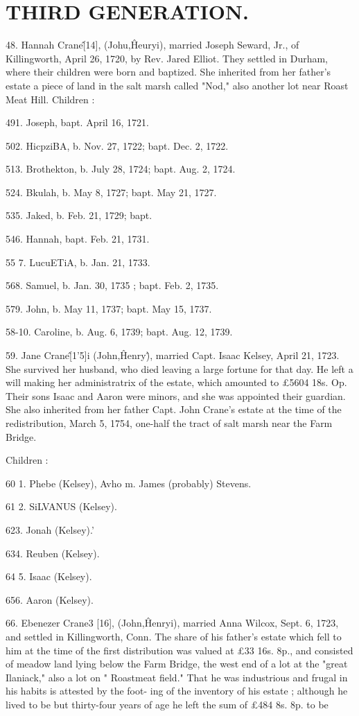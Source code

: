 \section{THIRD GENERATION.}


48. Hannah Crane\^ [14], (Johu,\^ Heuryi), married Joseph 
Seward, Jr., of Killingworth, April 26, 1720, by Rev. Jared 
Elliot. They settled in Durham, where their children were born 
and baptized. She inherited from her father's estate a piece of 
land in the salt marsh called "Nod," also another lot near Roast 
Meat Hill. Children : 

491. Joseph, bapt. April 16, 1721. 

502. HicpziBA, b. Nov. 27, 1722; bapt. Dec. 2, 1722. 

 513. Brothekton, b. July 28, 1724; bapt. Aug. 2, 1724. 

524. Bkulah, b. May 8, 1727; bapt. May 21, 1727. 

535. Jaked, b. Feb. 21, 1729; bapt. 

546. Hannah, bapt. Feb. 21, 1731. 

55  7. LucuETiA, b. Jan. 21, 1733. 

568. Samuel, b. Jan. 30, 1735 ; bapt. Feb. 2, 1735. 

579. John, b. May 11, 1737; bapt. May 15, 1737. 

58-10. Caroline, b. Aug. 6, 1739; bapt. Aug. 12, 1739. 

59. Jane Crane\^ [1'5]i (John,\^ Henry\^), married Capt. Isaac 
Kelsey, April 21, 1723. She survived her husband, who died 
leaving a large fortune for that day. He left a will making her 
administratrix of the estate, which amounted to £5604  18s.  Op. 
Their sons Isaac and Aaron were minors, and she was appointed 
their guardian. She also inherited from her father Capt. John 
Crane's estate at the time of the redistribution, March 5, 1754, 
one-half the tract of salt marsh near the Farm Bridge. 

Children : 

60  1. Phebe (Kelsey), Avho m. James (probably) Stevens. 

61  2. SiLVANUS (Kelsey). 

623. Jonah (Kelsey).' 

634. Reuben (Kelsey). 

64  5. Isaac (Kelsey). 

656. Aaron (Kelsey). 

66. Ebenezer Crane3 [16], (John,\^ Henryi), married Anna 
Wilcox, Sept. 6, 1723, and settled in Killingworth, Conn. The 
share of his father's estate which fell to him at the time of the 
first distribution was valued at £33  16s.  8p., and consisted of 
meadow land lying below the Farm Bridge, the west end of a lot 
at the "great Ilaniack," also a lot on " Roastmeat field." That 
he was industrious and frugal in his habits is attested by the foot- 
ing of the inventory of his estate ; although he lived to be but 
thirty-four years of age he left the sum of £484  8s.  8p. to be 





